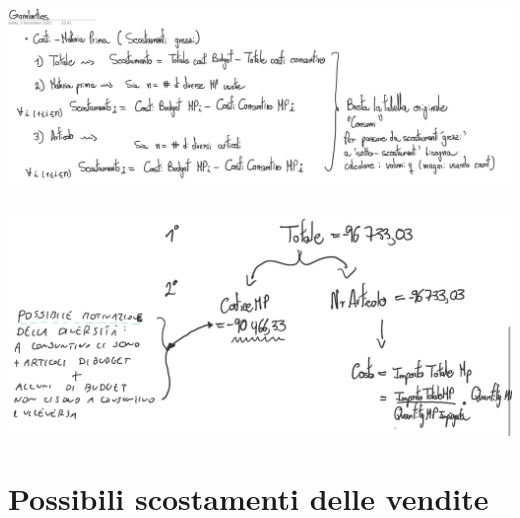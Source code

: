\documentclass{article}
\begin{document}
\includegraphics[scale = 0.25]{Scostamenti1.jpg}

\includegraphics[scale = 0.25]{Scostamenti2.jpg}
\section{Possibili scostamenti delle vendite}
\begin{itemize}
\end{itemize}
\end{document}
